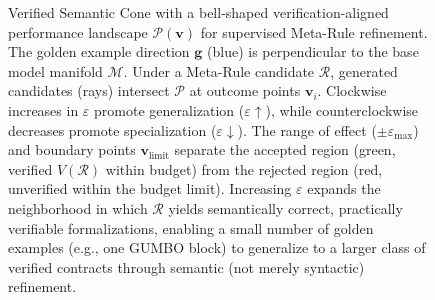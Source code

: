 \documentclass[conference]{IEEEtran}
\begin{document}


\begin{figure}[h]
\centering

\caption{
Verified Semantic Cone with a bell-shaped verification-aligned performance landscape $\mathcal{P}(\mathbf{v})$ for supervised Meta-Rule refinement. The golden example direction $\mathbf{g}$ (blue) is perpendicular to the base model manifold $\mathcal{M}$. Under a Meta-Rule candidate $\mathcal{R}$, generated candidates (rays) intersect $\mathcal{P}$ at outcome points $\mathbf{v}_i$. Clockwise increases in $\varepsilon$ promote generalization ($\varepsilon\uparrow$), while counterclockwise decreases promote specialization ($\varepsilon\downarrow$). The range of effect ($\pm\varepsilon_{\max}$) and boundary points $\mathbf{v}_{\text{limit}}$ separate the accepted region (green, verified $V(\mathcal{R})$ within budget) from the rejected region (red, unverified within the budget limit). Increasing $\varepsilon$ expands the neighborhood in which $\mathcal{R}$ yields semantically correct, practically verifiable formalizations, enabling a small number of golden examples (e.g., one GUMBO block) to generalize to a larger class of verified contracts through semantic (not merely syntactic) refinement.
}
\end{figure}
\end{document}
